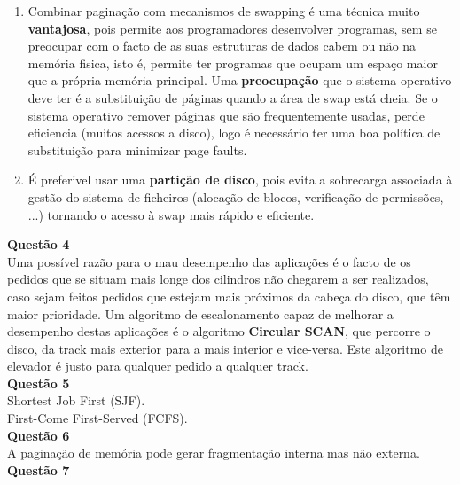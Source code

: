 \documentclass[a4paper, 11pt]{article}
\begin{document}
\begin{enumerate}
    \item Combinar paginação com mecanismos de swapping é uma técnica muito \textbf{vantajosa}, pois permite aos programadores desenvolver programas, sem se preocupar com o facto de as suas estruturas de dados cabem ou não na memória fisica, isto é, permite ter programas que ocupam um espaço maior que a própria memória principal. Uma \textbf{preocupação} que o sistema operativo deve ter é a substituição de páginas quando a área de swap está cheia. Se o sistema operativo remover páginas que são frequentemente usadas, perde eficiencia (muitos acessos a disco), logo é necessário ter uma boa política de substituição para minimizar page faults.
    
    \item É preferivel usar uma \textbf{partição de disco}, pois evita a sobrecarga associada à gestão do sistema de ficheiros (alocação de blocos, verificação de permissões, ...) tornando o acesso à swap mais rápido e eficiente.
\end{enumerate}

\noindent \textbf{Questão 4}\\

\noindent Uma possível razão para o mau desempenho das aplicações é o facto de os pedidos que se situam mais longe dos cilindros não chegarem a ser realizados, caso sejam feitos pedidos que estejam mais próximos da cabeça do disco, que têm maior prioridade. Um algoritmo de escalonamento capaz de melhorar a desempenho destas aplicações é o algoritmo \textbf{Circular SCAN}, que percorre o disco, da track mais exterior para a mais interior e vice-versa. Este algoritmo de elevador é justo para qualquer pedido a qualquer track.\\

\noindent \textbf{Questão 5}\\

\noindent {} Shortest Job First (SJF).\\

\noindent {} First-Come First-Served (FCFS).\\

\noindent \textbf{Questão 6}\\

\noindent {} A paginação de memória pode gerar fragmentação interna mas não externa.\\

\noindent \textbf{Questão 7}\\
\end{document}
